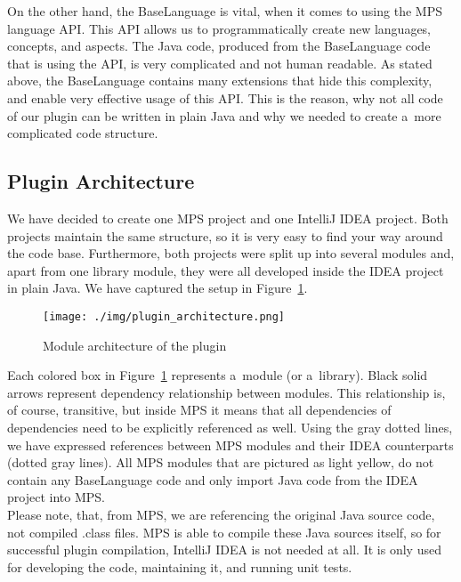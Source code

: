On the other hand, the BaseLanguage is vital, when it comes to using the MPS language API.
This API allows us to programmatically create new languages, concepts, and aspects.
The Java code, produced from the BaseLanguage code that is using the API, is very complicated and not human readable.
As stated above, the BaseLanguage contains many extensions that hide this complexity, and enable very effective usage of this API.
This is the reason, why not all code of our plugin can be written in plain Java and why we needed to create a~more complicated code structure.

\subsection{Plugin Architecture}

We have decided to create one MPS project and one IntelliJ IDEA project.
Both projects maintain the same structure, so it is very easy to find your way around the code base.
Furthermore, both projects were split up into several modules and, apart from one library module, they were all developed inside the IDEA project in plain Java.
We have captured the setup in Figure~\ref{fig:plugin_architecture}.

\begin{figure}[h]
	\centering
	\texttt{[image: ./img/plugin\_architecture.png]}
	\caption{Module architecture of the plugin}
	\label{fig:plugin_architecture}
\end{figure}

Each colored box in Figure~\ref{fig:plugin_architecture} represents a~module (or a~library).
Black solid arrows represent dependency relationship between modules.
This relationship is, of course, transitive, but inside MPS it means that all dependencies of dependencies need to be explicitly referenced as well.
Using the gray dotted lines, we have expressed references between MPS modules and their IDEA counterparts (dotted gray lines).
All MPS modules that are pictured as light yellow, do not contain any BaseLanguage code and only import Java code from the IDEA project into MPS.
\\

Please note, that, from MPS, we are referencing the original Java source code, not compiled .class files.
MPS is able to compile these Java sources itself, so for successful plugin compilation, IntelliJ IDEA is not needed at all.
It is only used for developing the code, maintaining it, and running unit tests.

